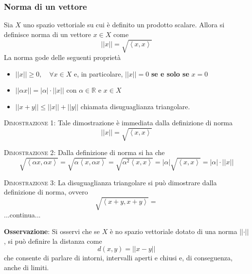 \documentclass[a4paper]{extarticle}
\begin{document}
\subsubsection{Norma di un vettore}
Sia $X$ uno spazio vettoriale su cui è definito un prodotto scalare. Allora si definisce norma di un vettore $x \in X$ come
\[\left \vert \left \vert x \right \vert \right \vert = \sqrt{\left<x,x\right>}\]
La norma gode delle seguenti proprietà
\begin{itemize}
    \item $\left \vert \left \vert x \right \vert \right \vert \geq 0, \hspace{1em} \forall x \in X$ e, in particolare, $\left \vert \left \vert x \right \vert \right \vert = 0$ \textbf{se e solo se} $x=0$
    \item $\left \vert \left \vert \alpha x \right \vert \right \vert = \left \vert \alpha \right \vert \cdot \left \vert \left \vert x \right \vert \right \vert$ con $\alpha \in \mathbb{R}$ e $x \in X$
    \item $\left \vert \left \vert x+y \right \vert \right \vert \leq \left \vert \left \vert x \right \vert \right \vert + \left \vert \left \vert y \right \vert \right \vert$ chiamata disuguaglianza triangolare.
\end{itemize}

\vspace{2em}
\noindent
\normalfont \normalsize
\textsc{Dimostrazione 1}: Tale dimostrazione è immediata dalla definizione di norma
\[\left \vert \left \vert x \right \vert \right \vert = \sqrt{\left<x,x\right>}\]

\vspace{2em}
\noindent
\normalfont \normalsize
\textsc{Dimostrazione 2}: Dalla definizione di norma si ha che
\[\sqrt{\left<\alpha x,\alpha x\right>} = \sqrt{\alpha \left<x,\alpha x\right>} = \sqrt{\alpha^2 \left<x,x\right>} = \left \vert \alpha \right \vert \sqrt{\left<x,x\right>} = \left \vert \alpha \right \vert \cdot \left \vert \left \vert x \right \vert \right \vert\]

\vspace{2em}
\noindent
\normalfont \normalsize
\textsc{Dimostrazione 3}: La disuguaglianza triangolare si può dimostrare dalla definizione di norma, ovvero
\[\sqrt{\left<x+y,x+y\right>}  =\]
...continua...

\vspace{1em}
\noindent
\textbf{Osservazione}: Si osservi che se $X$ è no spazio vettoriale dotato di una norma $\left \vert \left \vert \cdot \right \vert \right \vert$, si può definire la distanza come
\[d(x,y) = \left \vert \left \vert x-y \right \vert \right \vert\]
che consente di parlare di intorni, intervalli aperti e chiusi e, di conseguenza, anche di limiti.
\end{document}
